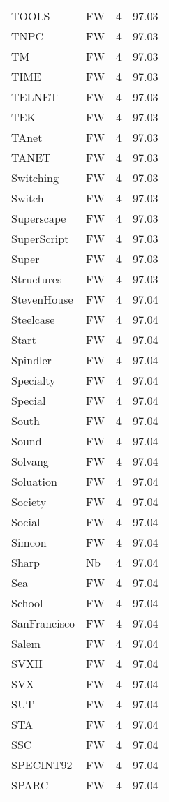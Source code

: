 \documentclass[twocolumn]{book}
\begin{document}
\begin{supertabular}{llrr}
TOOLS & FW & 4 &  97.03\\
TNPC & FW & 4 &  97.03\\
TM & FW & 4 &  97.03\\
TIME & FW & 4 &  97.03\\
TELNET & FW & 4 &  97.03\\
TEK & FW & 4 &  97.03\\
TAnet & FW & 4 &  97.03\\
TANET & FW & 4 &  97.03\\
Switching & FW & 4 &  97.03\\
Switch & FW & 4 &  97.03\\
Superscape & FW & 4 &  97.03\\
SuperScript & FW & 4 &  97.03\\
Super & FW & 4 &  97.03\\
Structures & FW & 4 &  97.03\\
StevenHouse & FW & 4 &  97.04\\
Steelcase & FW & 4 &  97.04\\
Start & FW & 4 &  97.04\\
Spindler & FW & 4 &  97.04\\
Specialty & FW & 4 &  97.04\\
Special & FW & 4 &  97.04\\
South & FW & 4 &  97.04\\
Sound & FW & 4 &  97.04\\
Solvang & FW & 4 &  97.04\\
Soluation & FW & 4 &  97.04\\
Society & FW & 4 &  97.04\\
Social & FW & 4 &  97.04\\
Simeon & FW & 4 &  97.04\\
Sharp & Nb & 4 &  97.04\\
Sea & FW & 4 &  97.04\\
School & FW & 4 &  97.04\\
SanFrancisco & FW & 4 &  97.04\\
Salem & FW & 4 &  97.04\\
SVXII & FW & 4 &  97.04\\
SVX & FW & 4 &  97.04\\
SUT & FW & 4 &  97.04\\
STA & FW & 4 &  97.04\\
SSC & FW & 4 &  97.04\\
SPECINT92 & FW & 4 &  97.04\\
SPARC & FW & 4 &  97.04\\

\end{supertabular}
\end{document}
